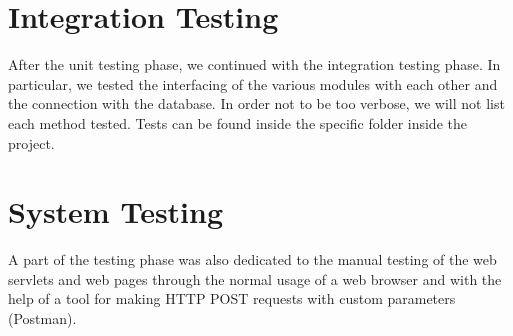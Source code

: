 \section{Integration Testing}
After the unit testing phase, we continued with the integration testing phase. In particular, we tested the interfacing of the various modules with each other and the connection with the database.
In order not to be too verbose, we will not list each method tested. Tests can be found inside the specific folder inside the project.

\section{System Testing}
A part of the testing phase was also dedicated to the manual testing of the web servlets and web pages through the normal usage of a web browser and with the help of a tool for making HTTP POST requests with custom parameters (Postman).